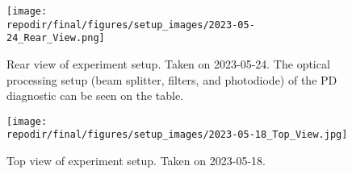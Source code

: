 
\begin{figure}[]
\centering
\texttt{[image: \\repodir/final/figures/setup\_images/2023-05-24\_Rear\_View.png]}
\caption{Rear view of experiment setup. Taken on 2023-05-24. The optical processing setup (beam splitter, filters, and photodiode) of the PD diagnostic can be seen on the table. }
\label{fig:SI_Rear_View}
\end{figure}

\begin{figure}[]
\centering
\texttt{[image: \\repodir/final/figures/setup\_images/2023-05-18\_Top\_View.jpg]}
\caption{Top view of experiment setup. Taken on 2023-05-18.}
\label{fig:SI_Top_View}
\end{figure}


